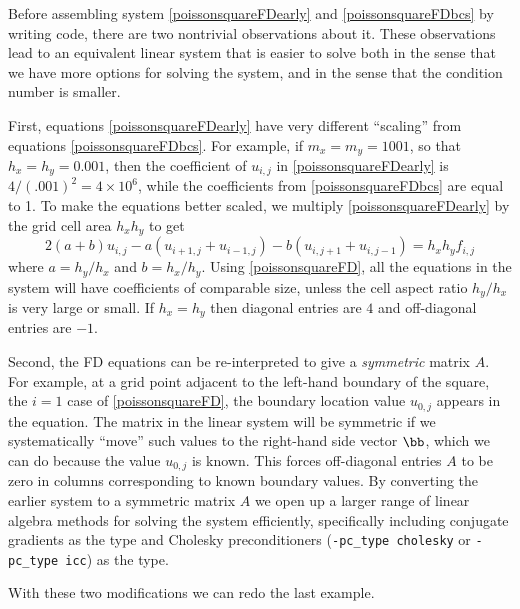 \medskip
Before assembling system \eqref{poissonsquareFDearly} and \eqref{poissonsquareFDbcs} by writing \PETSc code, there are two nontrivial observations about it.  These observations lead to an equivalent linear system that is easier to solve both in the sense that we have more options for solving the system, and in the sense that the condition number is smaller.

First, equations \eqref{poissonsquareFDearly} have very different ``scaling'' from equations \eqref{poissonsquareFDbcs}.  For example, if $m_x=m_y=1001$, so that $h_x=h_y=0.001$, then the coefficient of $u_{i,j}$ in \eqref{poissonsquareFDearly} is $4/(.001)^2 = 4 \times 10^6$, while the coefficients from \eqref{poissonsquareFDbcs} are equal to 1.  To make the equations better scaled, we multiply \eqref{poissonsquareFDearly} by the grid cell area $h_x h_y$ to get
\begin{equation}
2 (a + b) u_{i,j} - a \left(u_{i+1,j} + u_{i-1,j}\right) - b \left(u_{i,j+1} + u_{i,j-1}\right) = h_x h_y f_{i,j} \label{poissonsquareFD}
\end{equation}
where $a=h_y/h_x$ and $b=h_x/h_y$.  Using \eqref{poissonsquareFD}, all the equations in the system will have coefficients of comparable size, unless the cell aspect ratio $h_y/h_x$ is very large or small.  If $h_x=h_y$ then diagonal entries are $4$ and off-diagonal entries are $-1$.

Second, the FD equations can be re-interpreted to give a \emph{symmetric} matrix $A$.  For example, at a grid point adjacent to the left-hand boundary of the square, the $i=1$ case of \eqref{poissonsquareFD}, the boundary location value $u_{0,j}$ appears in the equation.  The matrix in the linear system will be symmetric if we systematically ``move'' such values to the right-hand side vector $\bb$, which we can do because the value $u_{0,j}$ is known.  This forces off-diagonal entries $A$ to be zero in columns corresponding to known boundary values.  By converting the earlier system to a symmetric matrix $A$ we open up a larger range of linear algebra methods for solving the system efficiently, specifically including conjugate gradients as the \pKSP type and Cholesky preconditioners (\texttt{-pc\_type cholesky} or \texttt{-pc\_type icc}) as the \pPC type.

With these two modifications we can redo the last example.

